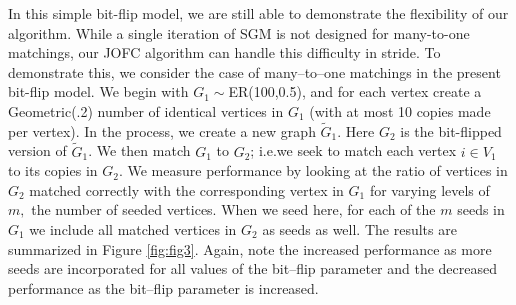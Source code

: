\documentclass[12pt]{article}
\numberwithin{equation}{section}
\theoremstyle{definition}
\begin{document}
In this simple bit-flip model, we are still able to demonstrate the
flexibility of our algorithm.  While a single iteration of SGM is not
designed for many-to-one matchings,
our JOFC algorithm can handle this difficulty in
stride.  To demonstrate this, we consider the case of many--to--one
matchings in the present bit-flip model.  We begin with
$G_1\sim$ER(100,0.5), and for each vertex create a Geometric(.2) number
of identical vertices in $G_1$ (with at most 10 copies made per vertex).
In the process, we create a new graph $\widetilde G_1$. Here $G_2$ is
the bit-flipped version of $\widetilde G_1$. We then match $G_1$ to
$G_2$; i.e.\@ we seek to match each vertex $i\in V_1$ to its copies in
$G_2$. We measure performance by looking at the ratio of vertices in
$G_2$ matched correctly with the corresponding vertex in $G_1$ for
varying levels of $m,$ the number of seeded vertices.  When we seed here,
for each of the $m$ seeds in $G_1$ we include all matched vertices in
$G_2$ as seeds as well.  The results are summarized in Figure
\ref{fig:fig3}.  Again, note the increased performance as more seeds are
incorporated for all values of the bit--flip parameter and the decreased
performance as the bit--flip parameter is increased.
\end{document}
